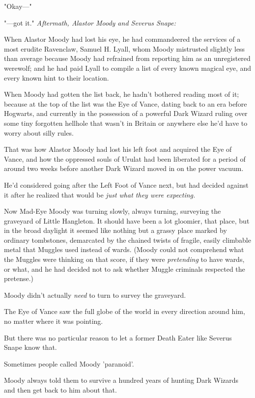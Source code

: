 "Okay---"

"---got it."
\sbreak
\emph{Aftermath, Alastor Moody and Severus Snape:}

When Alastor Moody had lost his eye, he had commandeered the services of a most 
erudite Ravenclaw, Samuel H. Lyall, whom Moody mistrusted slightly less than 
average because Moody had refrained from reporting him as an unregistered 
werewolf; and he had paid Lyall to compile a list of every known magical eye, 
and every known hint to their location.

When Moody had gotten the list back, he hadn't bothered reading most of it; 
because at the top of the list was the Eye of Vance, dating back to an era 
before Hogwarts, and currently in the possession of a powerful Dark Wizard 
ruling over some tiny forgotten hellhole that wasn't in Britain or anywhere 
else he'd have to worry about silly rules.

That was how Alastor Moody had lost his left foot and acquired the Eye of 
Vance, and how the oppressed souls of Urulat had been liberated for a period of 
around two weeks before another Dark Wizard moved in on the power vacuum.

He'd considered going after the Left Foot of Vance next, but had decided 
against it after he realized that would be \emph{just what they were expecting.}

Now Mad-Eye Moody was turning slowly, always turning, surveying the graveyard 
of Little Hangleton. It should have been a lot gloomier, that place, but in the 
broad daylight it seemed like nothing but a grassy place marked by ordinary 
tombstones, demarcated by the chained twists of fragile, easily climbable metal 
that Muggles used instead of wards. (Moody could not comprehend what the 
Muggles were thinking on that score, if they were \emph{pretending} to have 
wards, or what, and he had decided not to ask whether Muggle criminals 
respected the pretense.)

Moody didn't actually \emph{need} to turn to survey the graveyard.

The Eye of Vance saw the full globe of the world in every direction around him, 
no matter where it was pointing.

But there was no particular reason to let a former Death Eater like Severus 
Snape know that.

Sometimes people called Moody 'paranoid'.

Moody always told them to survive a hundred years of hunting Dark Wizards and 
then get back to him about that.


